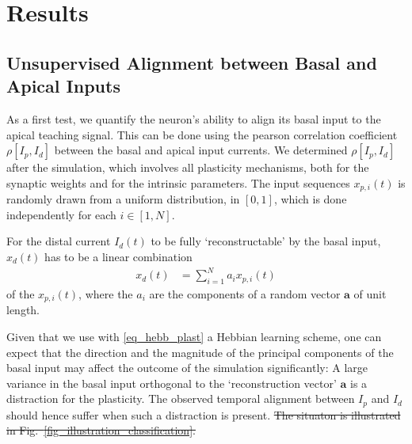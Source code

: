 \documentclass[utf8]{frontiersSCNS} %
\providecommand{\DIFdeltex}[1]{{\protect\color{red}\sout{#1}}}                      %
\providecommand{\DIFdelbegin}{} %
\providecommand{\DIFdelend}{} %
\providecommand{\DIFdel}[1]{\texorpdfstring{\DIFdeltex{#1}}{}} %
\begin{document}
\section{Results}
\label{sect:results}

\subsection{Unsupervised Alignment between Basal and Apical Inputs}
\label{sect:alignment}

As a first test, we quantify the neuron's ability to 
align its basal input to the apical teaching signal.
This can be done using the pearson correlation coefficient
$\rho[I_p,I_d]$ between the basal and 
apical input currents. We determined 
$\rho[I_p,I_d]$ after the simulation,
which involves all plasticity mechanisms, both
for the synaptic weights and for the intrinsic 
parameters. The input sequences $x_{p,i}(t)$ 
is randomly drawn from a uniform distribution,
in $[0,1]$, which is done independently for 
each $i\in[1,N]$.

For the distal current $I_d(t)$ to be fully 
`reconstructable' by the basal input, $x_d(t)$ has 
to be a linear combination 
\begin{align}
x_d(t) &= \sum_{i=1}^N a_i x_{p,i}(t)
\label{eq_x_d_a}
\end{align}
of the $x_{p,i}(t)$, where the $a_i$ are the
components of a random vector $\mathbf{a}$ 
of unit length. 

Given that we use with \eqref{eq_hebb_plast}
a Hebbian learning scheme, one can expect that
the direction and the magnitude of the principal 
components of the basal input may affect the
outcome of the simulation significantly:
A large variance in the basal input 
orthogonal to the `reconstruction vector' $\mathbf{a}$ 
is a distraction for the plasticity. The
observed temporal alignment between $I_p$ and 
$I_d$ should hence suffer when such a 
distraction is present. 
\DIFdelbegin \DIFdel{The situaton is illustrated 
in Fig.~\ref{fig_illustration_classification}.
}\DIFdelend %
\end{document}
